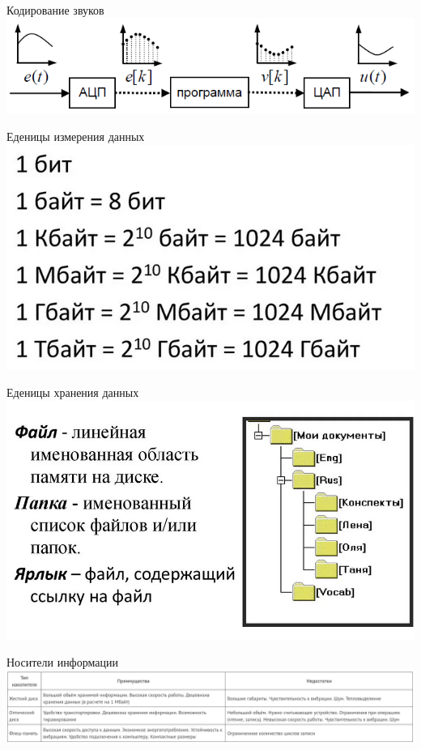 \documentclass[10pt,pdf,hyperref={unicode}]{beamer}%
\begin{document}
\begin{frame}{Кодирование звуков}
  \includegraphics[width=\textwidth]{p4.png}
\end{frame}

\begin{frame}{Еденицы измерения данных}
  \includegraphics[width=\textwidth]{p5.png}
\end{frame}

\begin{frame}{Еденицы хранения данных}
  \includegraphics[width=\textwidth]{file.png}
\end{frame}

\begin{frame}{Носители информации}
  \includegraphics[width=\textwidth]{p6.png}
\end{frame}
\end{document}

